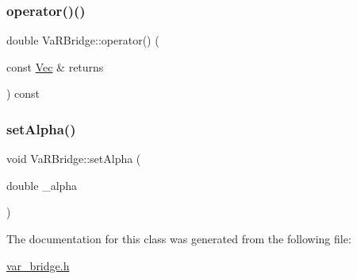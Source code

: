 \hypertarget{classVaRBridge_a4096da6ab396d3a92fc3423d08328bb0}{}\label{classVaRBridge_a4096da6ab396d3a92fc3423d08328bb0} 
\subsubsection{\texorpdfstring{operator()()}{operator()()}\hspace{0.1cm}{\footnotesize\ttfamily [3/3]}}
{\footnotesize\ttfamily double Va\+R\+Bridge\+::operator() (\begin{DoxyParamCaption}\item[{const \hyperlink{compute__returns__eigen_8h_a1eb6a9306ef406d7975f3cbf2e247777}{Vec} \&}]{returns }\end{DoxyParamCaption}) const\hspace{0.3cm}{\ttfamily [inline]}}

\hypertarget{classVaRBridge_a0101d9c9ee840f8720342f3639cd58dc}{}\label{classVaRBridge_a0101d9c9ee840f8720342f3639cd58dc} 
\subsubsection{\texorpdfstring{set\+Alpha()}{setAlpha()}}
{\footnotesize\ttfamily void Va\+R\+Bridge\+::set\+Alpha (\begin{DoxyParamCaption}\item[{double}]{\+\_\+alpha }\end{DoxyParamCaption})\hspace{0.3cm}{\ttfamily [inline]}}



The documentation for this class was generated from the following file\+:\begin{DoxyCompactItemize}
\item 
\hyperlink{var__bridge_8h}{var\+\_\+bridge.\+h}\end{DoxyCompactItemize}
